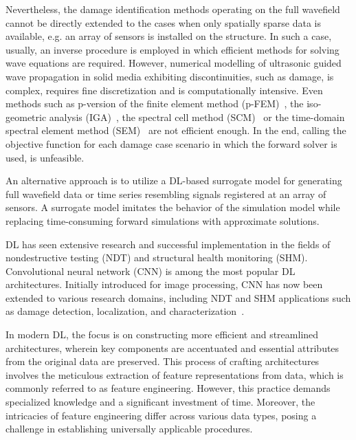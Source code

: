 Nevertheless, the damage identification methods operating on the full wavefield cannot be directly extended to the cases when only spatially sparse data is available, e.g. an array of sensors is installed on the structure.
In such a case, usually, an inverse procedure is employed in which efficient 
methods for solving wave equations are required.  
However, numerical modelling of ultrasonic guided wave propagation in solid media exhibiting discontinuities, such as damage, is complex, requires fine discretization and is computationally intensive.
Even methods such as p-version of the finite element method (p-FEM)~\cite{Duczek2013}, the iso-geometric analysis (IGA)~\cite{Anitescu2019}, the spectral cell method (SCM)~\cite{Mossaiby2019} or the time-domain spectral element method (SEM)~\cite{Ostachowicz2012} are not efficient enough.
In the end, calling the objective function for each damage case scenario in which the forward solver is used, is unfeasible.

An alternative approach is to utilize a DL-based surrogate model for generating full wavefield data or time series resembling signals registered at an array of sensors. 
A surrogate model imitates the behavior of the simulation model while replacing time-consuming forward simulations with approximate solutions.

DL has seen extensive research and successful implementation in the fields of nondestructive testing (NDT) and structural health monitoring (SHM). 
Convolutional neural network (CNN) is among the most popular DL architectures. 
Initially introduced for image processing, CNN has now been extended to various research domains, including NDT and SHM applications such as damage detection, localization, and characterization~\cite{rautela2019deep, pandey2022explainable, ijjeh2021full, ijjeh2022deep}.

In modern DL, the focus is on constructing more efficient and streamlined architectures, wherein key components are accentuated and essential attributes from the original data are preserved. 
This process of crafting architectures involves the meticulous extraction of feature representations from data, which is commonly referred to as feature engineering. 
However, this practice demands specialized knowledge and a significant investment of time. 
Moreover, the intricacies of feature engineering differ across various data types, posing a challenge in establishing universally applicable procedures.

